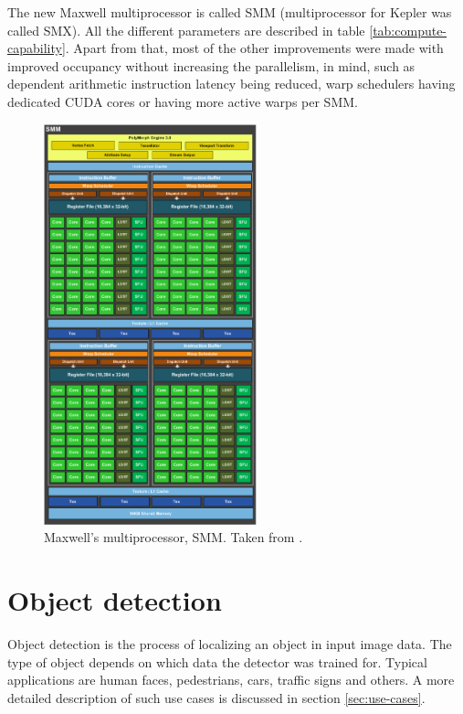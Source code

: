 The new Maxwell multiprocessor is called SMM (multiprocessor for Kepler was called SMX). All the different parameters are described in table \ref{tab:compute-capability}. Apart from that, most of the other improvements were made with improved occupancy without increasing the parallelism, in mind, such as dependent arithmetic instruction latency being reduced, warp schedulers having dedicated CUDA cores or having more active warps per SMM.

\begin{center}
\begin{figure}[ht]
	\centering\includegraphics[width=0.55\textwidth]{fig/smm.png}
	\caption{Maxwell's multiprocessor, SMM.	Taken from \cite{maxwell-whitepaper}.}\label{fig:smm}
\end{figure}
\end{center}

\chapter{Object detection} \label{ch:object-detection}

Object detection is the process of localizing an object in input image data. The type of object depends on which data the detector was trained for. Typical applications are human faces, pedestrians, cars, traffic signs and others. A more detailed description of such use cases is discussed in section \ref{sec:use-cases}.

